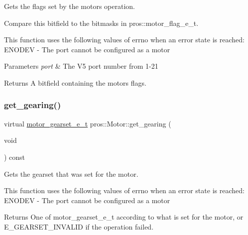 Gets the flags set by the motor\textquotesingle{}s operation.

Compare this bitfield to the bitmasks in pros\+::motor\+\_\+flag\+\_\+e\+\_\+t.

This function uses the following values of errno when an error state is reached\+: E\+N\+O\+D\+EV -\/ The port cannot be configured as a motor


\begin{DoxyParams}{Parameters}
{\em port} & The V5 port number from 1-\/21\\
\hline
\end{DoxyParams}
\begin{DoxyReturn}{Returns}
A bitfield containing the motor\textquotesingle{}s flags. 
\end{DoxyReturn}
\mbox{\label{classpros_1_1Motor_a3227bc4fbe531638472fff4dfb134333}} 
\subsubsection{\texorpdfstring{get\+\_\+gearing()}{get\_gearing()}}
{\footnotesize\ttfamily virtual \hyperlink{motors_8h_aa2f1c305c998abc3bf8dd1f76fa4da8b}{motor\+\_\+gearset\+\_\+e\+\_\+t} pros\+::\+Motor\+::get\+\_\+gearing (\begin{DoxyParamCaption}\item[{void}]{ }\end{DoxyParamCaption}) const\hspace{0.3cm}{\ttfamily [virtual]}}

Gets the gearset that was set for the motor.

This function uses the following values of errno when an error state is reached\+: E\+N\+O\+D\+EV -\/ The port cannot be configured as a motor

\begin{DoxyReturn}{Returns}
One of motor\+\_\+gearset\+\_\+e\+\_\+t according to what is set for the motor, or E\+\_\+\+G\+E\+A\+R\+S\+E\+T\+\_\+\+I\+N\+V\+A\+L\+ID if the operation failed. 
\end{DoxyReturn}
\mbox{\label{classpros_1_1Motor_a5b0e644c8af396a6af8142b41d1bc7b6}} 
